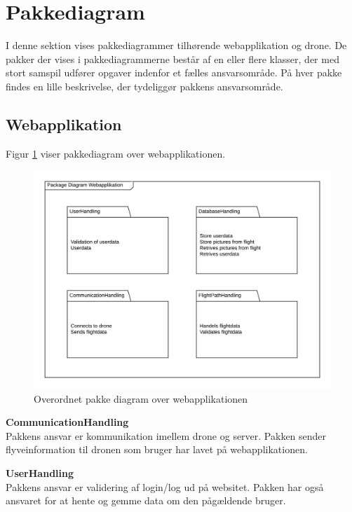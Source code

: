 \section{Pakkediagram}

I denne sektion vises pakkediagrammer tilhørende webapplikation og drone. De pakker der vises i pakkediagrammerne består af en eller flere klasser, der med stort samspil udfører opgaver indenfor et fælles ansvarsområde. På hver pakke findes en lille beskrivelse, der tydeliggør pakkens ansvarsområde.

\subsection{Webapplikation}
Figur \ref{fig:pakke_diagram_webapp} viser pakkediagram over webapplikationen. 

\vspace{-5pt}
\begin{figure}[H]
	\centering
	\includegraphics[width=1\textwidth]{Billeder/pakke_diagrammer/package_diagram_webapp.png}
	\vspace{-1cm}
	\caption{Overordnet pakke diagram over webapplikationen}
	\label{fig:pakke_diagram_webapp}
\end{figure}

\textbf{CommunicationHandling}\\
Pakkens ansvar er kommunikation imellem drone og server. Pakken sender flyveinformation til dronen som bruger har lavet på webapplikationen.

\textbf{UserHandling}\\
Pakkens ansvar er validering af login/log ud på websitet. Pakken har også ansvaret for at hente og gemme data om den pågældende bruger.

